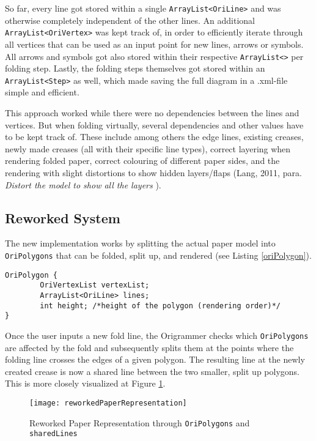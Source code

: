 So far, every line got stored within a single \texttt{ArrayList<OriLine>} and was otherwise completely independent of the other lines. An additional\\
\texttt{ArrayList<OriVertex>} was kept track of, in order to efficiently iterate through all vertices that can be used as an input point for new lines, arrows or symbols. All arrows and symbols got also stored within their respective \texttt{ArrayList<>} per folding step. Lastly, the folding steps themselves got stored within an \texttt{ArrayList<Step>} as well, which made saving the full diagram in a .xml-file simple and efficient.

This approach worked while there were no dependencies between the lines and vertices. But when folding virtually, several dependencies and other values have to be kept track of. These include among others the edge lines, existing creases, newly made creases (all with their specific line types), correct layering when rendering folded paper, correct colouring of different paper sides, and the rendering with slight distortions to show hidden layers/flaps (Lang, 2011, para.  \emph{Distort the model to show all the layers} \cite{Lang}).

\newpage
\subsection{Reworked System}

The new implementation works by splitting the actual paper model into \texttt{OriPolygons} that can be folded, split up, and rendered (see Listing \ref{oriPolygon}).
\begin{lstlisting}[label=oriPolygon,caption=OriPolygon]
OriPolygon {
        OriVertexList vertexList; 
        ArrayList<OriLine> lines;
        int height; /*height of the polygon (rendering order)*/
}
\end{lstlisting}

\noindent Once the user inputs a new fold line, the Origrammer checks which \texttt{OriPolygons} are affected by the fold and subsequently splits them at the points where the folding line crosses the edges of a given polygon. The resulting line at the newly created crease is now a shared line between the two smaller, split up polygons. This is more closely visualized at Figure \ref{fig:reworkedPaperRepresentation}.
 \begin{figure}[htbp]
	\centering
	\texttt{[image: reworkedPaperRepresentation]}
	\caption{Reworked Paper Representation through \texttt{OriPolygons} and \texttt{sharedLines}}
	\label{fig:reworkedPaperRepresentation}
\end{figure}


